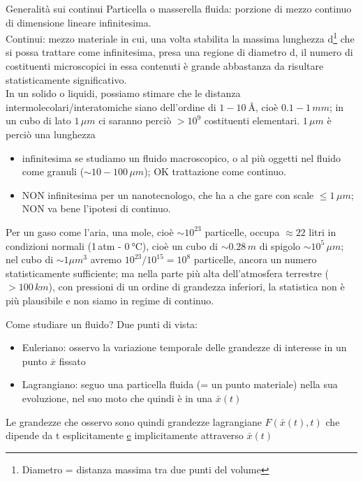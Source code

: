 \documentclass[a4paper,11pt]{report}
\newcommand{\x}{\bar{x}}
\begin{document}
	\begin{chapter}{Generalità sui continui}
		Particella o masserella fluida: porzione di mezzo continuo di dimensione lineare infinitesima.\\
		Continui: mezzo materiale in cui, una volta stabilita la massima lunghezza d\footnote{Diametro = distanza massima tra due punti del volume} che si possa trattare come infinitesima, presa una regione di diametro d, il numero di costituenti microscopici in essa contenuti è grande abbastanza da risultare statisticamente significativo.\\
		
		In un solido o liquidi, possiamo stimare che le distanza intermolecolari/interatomiche siano dell'ordine di $1-\SI{10}{\angstrom}$, cioè $0.1-1\,mm$; in un cubo di lato $1\,\mu m$ ci saranno perciò $>10^9$ costituenti elementari. 
		$1\,\mu m$ è perciò una lunghezza
		\begin{itemize}
			\item infinitesima se studiamo un fluido macroscopico, o al più oggetti nel fluido come granuli ($\sim 10-100\,\mu m$); OK trattazione come continuo.
			\item NON infinitesima per un nanotecnologo, che ha a che gare con scale $\leq 1\,\mu m$; NON va bene l'ipotesi di continuo.
		\end{itemize}
		
		Per un gaso come l'aria, una mole, cioè $\sim 10^{23}$ particelle, occupa $\approx 22$ litri in condizioni normali (1\,atm - $\SI{0}{\celsius}$), cioè un cubo di $\sim 0.28\,m$ di spigolo $\sim 10^5\,\mu m$; nel cubo di $\sim 1\mu m^3$ avremo $10^{23}/10^{15} = 10^8$ particelle, ancora un numero statisticamente sufficiente;
		ma nella parte più alta dell'atmosfera terrestre ($>100\,km$), con pressioni di un ordine di grandezza inferiori, la statistica non è più plausibile e non siamo in regime di continuo.
		
		Come studiare un fluido? Due punti di vista:
		\begin{itemize}
			\item Euleriano: osservo la variazione temporale delle grandezze di interesse in un punto $\overline{x}$ fissato
			
			\item Lagrangiano: seguo una particella fluida (= un punto materiale) nella sua evoluzione, nel suo moto che quindi è in una $\x(t)$
		\end{itemize}
		Le grandezze che osservo sono quindi grandezze lagrangiane $F(\x(t),t)$ che dipende da t esplicitamente \underline{e} implicitamente attraverso $\x(t)$
		

\end{chapter}
\end{document}
